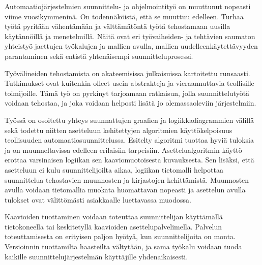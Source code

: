 \documentclass[finnish,12pt]{article}
\begin{document}
Automaatiojärjestelmien suunnittelu- ja ohjelmointityö on muuttunut nopeasti viime vuosikymmeninä. On todennäköistä, että se muuttuu edelleen.
Turhaa työtä pyritään vähentämään ja välttämätöntä työtä tehostamaan uusilla käytännöillä ja menetelmillä.
Näitä ovat eri työvaiheiden- ja tehtävien saumaton yhteistyö jaettujen työkalujen ja mallien avulla, mallien uudelleenkäytettävyyden parantaminen sekä entistä yhtenäisempi suunnitteluprosessi.

Työvälineiden tehostamista on akateemisissa julkaisuissa kartoitettu runsaasti.
Tutkimukset ovat kuitenkin olleet usein abstrakteja ja vieraannuttavia teollisille toimijoille.
Tämä työ on pyrkinyt tarjoamaan ratkaisun, jolla suunnittelutyötä voidaan tehostaa, ja joka voidaan helposti lisätä jo olemassaoleviin järjestelmiin.

Työssä on osoitettu yhteys suunnattujen graafien ja logiikkadiagrammien välillä sekä todettu niitten asetteluun kehitettyjen algoritmien käyttökelpoisuus teollisuuden automaatiosuunnittelussa.
Esitelty algoritmi tuottaa hyviä tuloksia ja on muunneltavissa edelleen erilaisiin tarpeisiin.
Asettelualgoritmin käyttö erottaa varsinaisen logiikan sen kaaviomuotoisesta kuvauksesta.
Sen lisäksi, että asetteluun ei kulu suunnittelijoilta aikaa, logiikan tietomalli helpottaa suunnittelua tehostavien muunnosten ja kirjastojen kehittämistä.
Muunnosten avulla voidaan tietomallia muokata huomattavan nopeasti ja asettelun avulla tulokset ovat välittömästi asiakkaalle luettavassa muodossa.

Kaavioiden tuottaminen voidaan toteuttaa suunnittelijan käyttämällä tietokoneella tai keskitetyllä kaavioiden asettelupalvelimella.
Palvelun toteuttamisesta on erityisen paljon hyötyä, kun suunnittelijoita on monta.
Versioinnin tuottamilta haasteilta vältytään, ja sama työkalu voidaan tuoda kaikille suunnittelujärjestelmän käyttäjille yhdenaikaisesti.

\clearpage
{}


\end{document}
